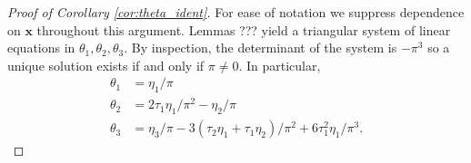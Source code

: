 \begin{proof}[Proof of Corollary \ref{cor:theta_ident}]
  For ease of notation we suppress dependence on $\mathbf{x}$ throughout this argument.
  Lemmas ??? yield a triangular system of linear equations in $\theta_1, \theta_2, \theta_3$.
By inspection, the determinant of the system is $-\pi^3$ so a unique solution exists if and only if $\pi \neq 0$. 
In particular,
\begin{align*}
  \theta_1 &= \eta_1 / \pi\\
  \theta_2 &= 2\tau_1\eta_1/\pi^2 - \eta_2/\pi\\
  \theta_3 &= \eta_3/\pi - 3(\tau_2\eta_1 + \tau_1\eta_2)/\pi^2 + 6\tau_1^2\eta_1/\pi^3.
\end{align*}
\end{proof}

